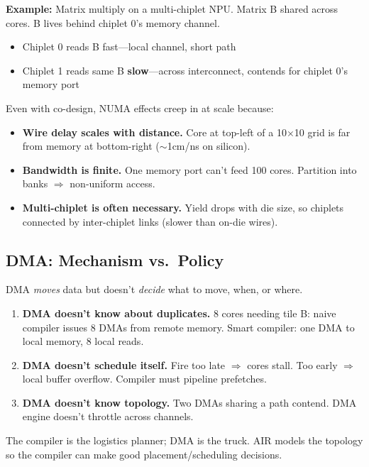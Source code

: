 \documentclass[11pt,a4paper]{article}
\begin{document}
\textbf{Example:} Matrix multiply on a multi-chiplet NPU. Matrix B shared across
cores. B lives behind chiplet 0's memory channel.
\begin{itemize}[leftmargin=2em]
  \item Chiplet 0 reads B fast---local channel, short path
  \item Chiplet 1 reads same B \textbf{slow}---across interconnect, contends for
    chiplet 0's memory port
\end{itemize}

Even with co-design, NUMA effects creep in at scale because:
\begin{itemize}[leftmargin=2em]
  \item \textbf{Wire delay scales with distance.} Core at top-left of a 10$\times$10
    grid is far from memory at bottom-right ($\sim$1cm/ns on silicon).
  \item \textbf{Bandwidth is finite.} One memory port can't feed 100 cores. Partition
    into banks $\Rightarrow$ non-uniform access.
  \item \textbf{Multi-chiplet is often necessary.} Yield drops with die size, so
    chiplets connected by inter-chiplet links (slower than on-die wires).
\end{itemize}

\subsection{DMA: Mechanism vs.\ Policy}

DMA \emph{moves} data but doesn't \emph{decide} what to move, when, or where.

\begin{enumerate}[leftmargin=2em]
  \item \textbf{DMA doesn't know about duplicates.} 8 cores needing tile B: naive
    compiler issues 8 DMAs from remote memory. Smart compiler: one DMA to local
    memory, 8 local reads.
  \item \textbf{DMA doesn't schedule itself.} Fire too late $\Rightarrow$ cores stall.
    Too early $\Rightarrow$ local buffer overflow. Compiler must pipeline prefetches.
  \item \textbf{DMA doesn't know topology.} Two DMAs sharing a path contend.
    DMA engine doesn't throttle across channels.
\end{enumerate}

The compiler is the logistics planner; DMA is the truck. AIR models the topology so
the compiler can make good placement/scheduling decisions.
\end{document}
